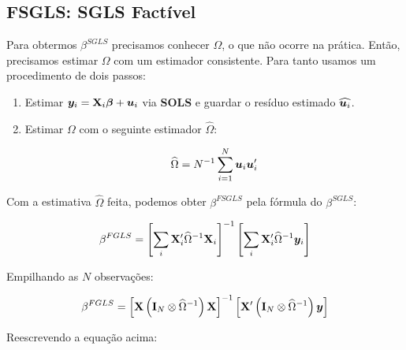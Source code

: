 \documentclass[11pt, oneside, a4paper, article]{article}
\numberwithin{equation}{section}
\begin{document}
\begin{description}
\noindent
\citet[Sec.7.5 -- Feasible GLS, p.153]{wool-2010} 

\subsection{FSGLS: SGLS Factível}

Para obtermos $\beta^{SGLS}$ precisamos conhecer $\Omega$, o que não ocorre na prática.
Então, precisamos estimar $\Omega$ com um estimador consistente.
Para tanto usamos um procedimento de dois passos:

\begin{enumerate}
\item  %
Estimar $\boldsymbol{y}_{i} = \mathbf{X}_{i} \boldsymbol{\beta} + \boldsymbol{u}_{i}$ via \textbf{SOLS} e guardar o resíduo estimado $\widehat{\boldsymbol{u}_{i}}$.

\item  %
Estimar $\Omega$ com o seguinte estimador $\widehat{\Omega}$:

\vspace{-1.5 em}
\begin{align*}
	\widehat{\Omega} 
	= 
	N^{-1} \sum_{i=1}^{N} \boldsymbol{u}_{i} \boldsymbol{u}_{i}'
\end{align*}
\end{enumerate}

Com a estimativa $\widehat{\Omega}$ feita, podemos obter $\beta^{FSGLS}$ pela fórmula do $\beta^{SGLS}$:

\vspace{-1.5 em}
\begin{align*}
	\beta^{FGLS}
	= 
	\left[ 
		\sum_{i} \mathbf{X}_{i}' \widehat{\Omega}^{-1} \mathbf{X}_{i}
	\right]^{-1}
	\left[ 
		\sum_{i} \mathbf{X}_{i}' \widehat{\Omega}^{-1} \boldsymbol{y}_{i}
	\right]
\end{align*}

Empilhando as $N$ observações:

\vspace{-1.5 em}
\begin{align*}
\beta^{FGLS}
= 
\left[ \mathbf{X} \left( \mathbf{I}_{N} \otimes \widehat{\Omega}^{-1} \right) \mathbf{X} \right]^{-1}
\left[ \mathbf{X}' \left( \mathbf{I}_{N} \otimes \widehat{\Omega}^{-1} \right) \boldsymbol{y} \right]
\end{align*}

Reescrevendo a equação acima:


\end{description}
\end{document}
